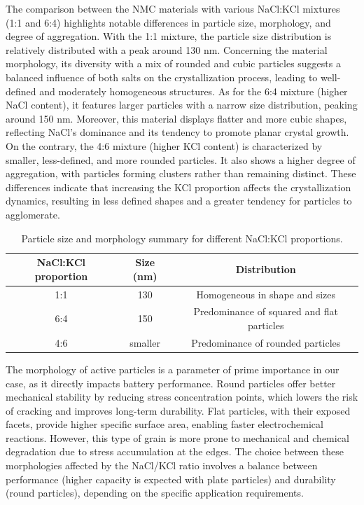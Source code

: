 \documentclass{article}
\begin{document}
The comparison between the NMC materials with various NaCl:KCl mixtures (1:1 and 6:4) highlights notable differences in particle size, morphology, and degree of aggregation. With the 1:1 mixture, the particle size distribution is relatively distributed with a peak around 130 nm. Concerning the material morphology, its diversity with a mix of rounded and cubic particles suggests a balanced influence of both salts on the crystallization process, leading to well-defined and moderately homogeneous structures. As for the 6:4 mixture (higher NaCl content), it features larger particles with a narrow size distribution, peaking around 150 nm. Moreover, this material displays flatter and more cubic shapes, reflecting NaCl's dominance and its tendency to promote planar crystal growth. On the contrary, the 4:6 mixture (higher KCl content) is characterized by smaller, less-defined, and more rounded particles. It also shows a higher degree of aggregation, with particles forming clusters rather than remaining distinct. These differences indicate that increasing the KCl proportion affects the crystallization dynamics, resulting in less defined shapes and a greater tendency for particles to agglomerate. \\
\begin{table}[H]
  \centering
  \begin{tabular}{|c|c|c|}
    \hline
    \textbf{NaCl:KCl proportion} & \textbf{Size (nm)} & \textbf{Distribution} \\
    \hline
    1:1 & 130 & Homogeneous in shape and sizes \\
    \hline
    6:4 & 150 & Predominance of squared and flat particles \\
    \hline
    4:6 & smaller & Predominance of rounded particles \\
    \hline
  \end{tabular}
  \caption{Particle size and morphology summary for different NaCl:KCl proportions.}
  \label{tab:particle_size_distribution}
\end{table}
The morphology of active particles is a parameter of prime importance in our case, as it directly impacts battery performance. Round particles offer better mechanical stability by reducing stress concentration points, which lowers the risk of cracking and improves long-term durability. Flat particles, with their exposed facets, provide higher specific surface area, enabling faster electrochemical reactions. However, this type of grain is more prone to mechanical and chemical degradation due to stress accumulation at the edges. The choice between these morphologies affected by the NaCl/KCl ratio involves a balance between performance (higher capacity is expected with plate particles) and durability (round particles), depending on the specific application requirements. \\
\end{document}
